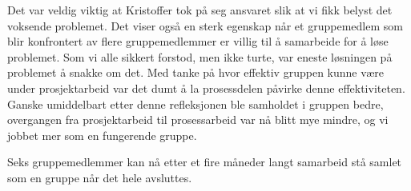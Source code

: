 Det var veldig viktig at Kristoffer tok på seg ansvaret slik at vi fikk belyst det voksende problemet.
Det viser også en sterk egenskap når et gruppemedlem som blir konfrontert av flere gruppemedlemmer er villig til 
å samarbeide for å løse problemet. 
Som vi alle sikkert forstod, men ikke turte, var eneste løsningen på problemet å snakke om det. 
Med tanke på hvor effektiv gruppen kunne være under prosjektarbeid var det dumt å la prosessdelen påvirke
denne effektiviteten. Ganske umiddelbart etter denne refleksjonen ble samholdet i gruppen bedre,
overgangen fra prosjektarbeid til prosessarbeid var nå blitt mye mindre, og vi jobbet mer som en fungerende gruppe.

Seks gruppemedlemmer kan nå etter et fire måneder langt samarbeid stå samlet som en gruppe når det hele avsluttes.